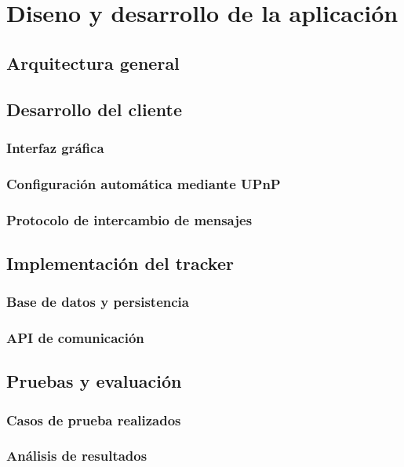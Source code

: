 \chapter{Diseno y desarrollo de la aplicaci\'on}

\section{Arquitectura general}

\section{Desarrollo del cliente}

\subsection{Interfaz gráfica}
\subsection{Configuración automática mediante UPnP}
\subsection{Protocolo de intercambio de mensajes}

\section{Implementación del tracker}
\subsection{Base de datos y persistencia}
\subsection{API de comunicación}

\section{Pruebas y evaluación}
\subsection{Casos de prueba realizados}
\subsection{Análisis de resultados}

